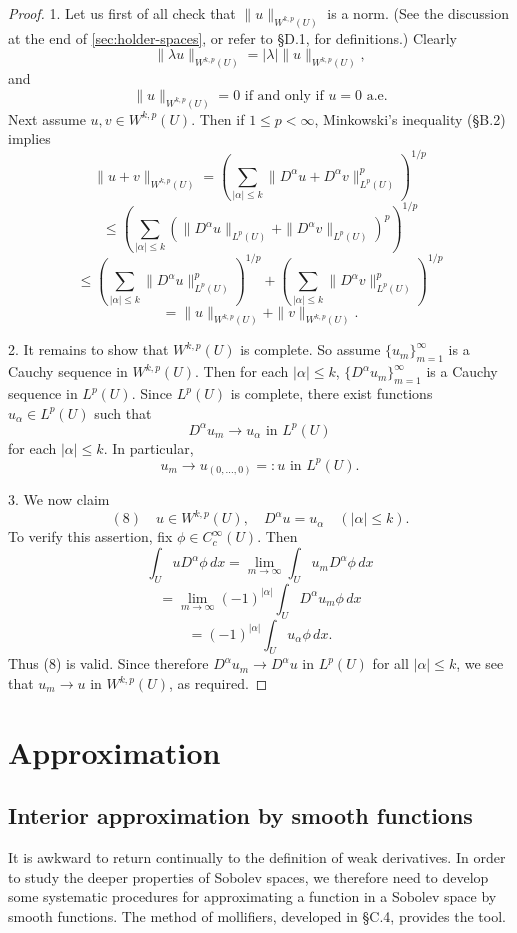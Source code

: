 \begin{proof}
1. Let us first of all check that $\|u\|_{W^{k,p}(U)}$ is a norm. (See the discussion at the end of \cref{sec:holder-spaces}, or refer to §D.1, for definitions.) Clearly
$$\|\lambda u\|_{W^{k,p}(U)} = |\lambda| \|u\|_{W^{k,p}(U)},$$
and
$$\|u\|_{W^{k,p}(U)} = 0 \text{ if and only if } u = 0 \text{ a.e.}$$
Next assume $u, v \in W^{k,p}(U)$. Then if $1 \le p < \infty$, Minkowski's inequality (§B.2) implies
$$\|u + v\|_{W^{k,p}(U)} = \left(\sum_{|\alpha| \le k} \|D^\alpha u + D^\alpha v\|_{L^p(U)}^p\right)^{1/p}$$
$$\le \left(\sum_{|\alpha| \le k} (\|D^\alpha u\|_{L^p(U)} + \|D^\alpha v\|_{L^p(U)})^p\right)^{1/p}$$
$$\le \left(\sum_{|\alpha| \le k} \|D^\alpha u\|_{L^p(U)}^p\right)^{1/p} + \left(\sum_{|\alpha| \le k} \|D^\alpha v\|_{L^p(U)}^p\right)^{1/p}$$
$$= \|u\|_{W^{k,p}(U)} + \|v\|_{W^{k,p}(U)}.$$

2. It remains to show that $W^{k,p}(U)$ is complete. So assume $\{u_m\}_{m=1}^\infty$ is a Cauchy sequence in $W^{k,p}(U)$. Then for each $|\alpha| \le k$, $\{D^\alpha u_m\}_{m=1}^\infty$ is a Cauchy sequence in $L^p(U)$. Since $L^p(U)$ is complete, there exist functions $u_\alpha \in L^p(U)$ such that
$$D^\alpha u_m \to u_\alpha \text{ in } L^p(U)$$
for each $|\alpha| \le k$. In particular,
$$u_m \to u_{(0,\ldots,0)} =: u \text{ in } L^p(U).$$

3. We now claim
$$(8) \quad u \in W^{k,p}(U), \quad D^\alpha u = u_\alpha \quad (|\alpha| \le k).$$
To verify this assertion, fix $\phi \in C_c^\infty(U)$. Then
$$\int_U u D^\alpha \phi \, dx = \lim_{m \to \infty} \int_U u_m D^\alpha \phi \, dx$$
$$= \lim_{m \to \infty} (-1)^{|\alpha|} \int_U D^\alpha u_m \phi \, dx$$
$$= (-1)^{|\alpha|} \int_U u_\alpha \phi \, dx.$$
Thus (8) is valid. Since therefore $D^\alpha u_m \to D^\alpha u$ in $L^p(U)$ for all $|\alpha| \le k$, we see that $u_m \to u$ in $W^{k,p}(U)$, as required.
\end{proof}

\section{Approximation}
\label{sec:sobolev-approximation}

\subsection{Interior approximation by smooth functions}

It is awkward to return continually to the definition of weak derivatives. In order to study the deeper properties of Sobolev spaces, we therefore need to develop some systematic procedures for approximating a function in a Sobolev space by smooth functions. The method of mollifiers, developed in §C.4, provides the tool.

